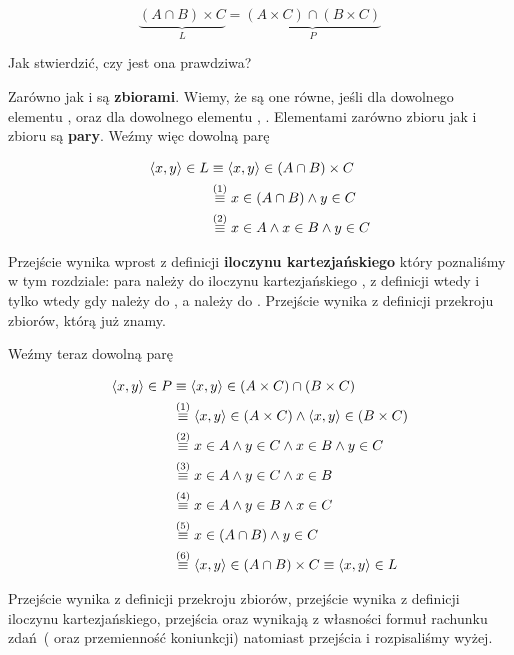 \[
    \underbrace{(A \cap B) \times C}_{L} = \underbrace{(A \times C) \cap (B \times C)}_{P} 
\]

Jak stwierdzić, czy jest ona prawdziwa?

Zarówno  jak i  są \textbf{zbiorami}. Wiemy, że są one równe, jeśli dla dowolnego elementu ,  oraz dla dowolnego elementu , . Elementami zarówno zbioru  jak i zbioru  są \textbf{pary}. Weźmy więc dowolną parę 

\[ 
\begin{split}
        \langle x,y \rangle \in L
        & \equiv \langle x,y \rangle \in (A \cap B) \times C 
        \\& \stackrel{(1)}{\equiv} x \in (A \cap B) \wedge y \in C
        \\& \stackrel{(2)}{\equiv} x \in A \wedge x \in B \wedge y \in C
\end{split}
\]

Przejście  wynika wprost z definicji \textbf{iloczynu kartezjańskiego} który poznaliśmy w tym rozdziale: para  należy do iloczynu kartezjańskiego , z definicji wtedy i tylko wtedy gdy  należy do , a  należy do . Przejście  wynika z definicji przekroju zbiorów, którą już znamy.

Weźmy teraz dowolną parę 

\[
\begin{split}
    \langle x,y \rangle \in P
    & \equiv \langle x,y \rangle \in (A \times C) \cap (B \times C) 
    \\& \stackrel{(1)}{\equiv} \langle x,y \rangle \in (A \times C) \wedge \langle x,y \rangle \in (B \times C) 
    \\& \stackrel{(2)}{\equiv} x \in A \wedge y \in C \wedge x \in B \wedge y \in C 
    \\& \stackrel{(3)}{\equiv} x \in A \wedge y \in C \wedge x \in B 
    \\& \stackrel{(4)}{\equiv} x \in A \wedge y \in B \wedge x \in C
    \\& \stackrel{(5)}{\equiv} x \in (A \cap B) \wedge y \in C
    \\& \stackrel{(6)}{\equiv}  \langle x,y \rangle \in (A \cap B) \times C \equiv \langle x,y \rangle \in L
\end{split}
\]

Przejście  wynika z definicji przekroju zbiorów, przejście  wynika z definicji iloczynu kartezjańskiego, przejścia  oraz  wynikają z własności formuł rachunku zdań~(\m{\varphi \wedge \varphi \equiv \varphi} oraz przemienność koniunkcji) natomiast przejścia  i  rozpisaliśmy wyżej.

